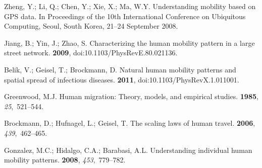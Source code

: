 \documentclass[ijgi,article,accept,moreauthors,pdftex,10pt,a4paper]{mdpi}
\theoremstyle{mdpi}
\newcounter{ex}
\newcounter{re}
\theoremstyle{mdpidefinition}
\begin{document}


\renewcommand\bibname{References}
\begin{thebibliography}{-------}
\providecommand{\natexlab}[1]{#1}

Zheng, Y.; Li, Q.; Chen, Y.; Xie, X.; Ma, W.Y.
\newblock Understanding mobility based on GPS data.
\newblock  In Proceedings of the 10th International Conference on Ubiquitous
  Computing, Seoul, South Korea, 21--24 September 2008.

Jiang, B.; Yin, J.; Zhao, S.
\newblock Characterizing the human mobility pattern in a large street network.
 {\bf 2009}, doi:10.1103/PhysRevE.80.021136.

Belik, V.; Geisel, T.; Brockmann, D.
\newblock Natural human mobility patterns and spatial spread of infectious
  diseases.
 {\bf 2011}, doi:10.1103/PhysRevX.1.011001.

Greenwood, M.J.
\newblock Human migration: Theory, models, and empirical studies.
 {\bf 1985}, {\em 25},~521--544.

Brockmann, D.; Hufnagel, L.; Geisel, T.
\newblock The scaling laws of human travel.
 {\bf 2006}, {\em 439},~462--465.

Gonzalez, M.C.; Hidalgo, C.A.; Barabasi, A.L.
\newblock Understanding individual human mobility patterns.
 {\bf 2008}, {\em 453},~779--782.


\end{thebibliography}
\end{document}
